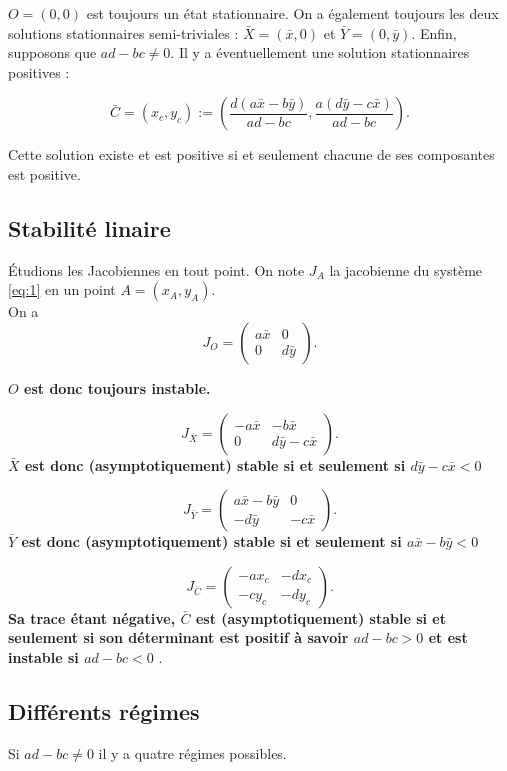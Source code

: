 \documentclass[a4paper,11pt,draft]{article}
\begin{document}
$O=(0,0)$ est toujours un état stationnaire. On a également toujours les deux solutions stationnaires semi-triviales :
$\bar{X}=(\bar{x},0)$ et $\bar{Y}=(0,\bar{y})$.
Enfin, supposons que $ad-bc\neq 0$. Il y a éventuellement une solution stationnaires positives :

$$\bar{C}=(x_c,y_c):=\left(\frac{d(a\bar{x}-b\bar{y})}{ad-bc},\frac{a(d\bar{y}-c\bar{x})}{ad-bc}\right).$$

Cette solution existe et est positive si et seulement chacune de ses composantes est positive.  
\subsection{Stabilité linaire}
\'Etudions les Jacobiennes en tout point. On note $J_A$ la jacobienne du système \eqref{eq:1} en un point $A=(x_A,y_A)$.\\
On a 
\begin{equation*}
J_O=
\begin{pmatrix}
    a\bar{x}&0\\
    0&d\bar{y}
\end{pmatrix}.
\end{equation*}

{\bf $O$ est donc toujours instable.}

\begin{equation*}
J_{\bar{X}}=
\begin{pmatrix}
    -a\bar{x}&-b\bar{x}\\
    0&d\bar{y}-c\bar{x}
\end{pmatrix}.
\end{equation*}
{\bf $\bar{X}$ est donc (asymptotiquement) stable si et seulement si $d\bar{y}-c\bar{x} <0$ }

$$J_{\bar{Y}}=
\begin{pmatrix}
    a\bar{x}-b\bar{y}&0\\
    -d\bar{y}&-c\bar{x}
\end{pmatrix}.
$$
{\bf $\bar{Y}$ est donc (asymptotiquement) stable si et seulement si $a\bar{x}-b\bar{y} <0$ }


$$J_{\bar{C}}=
\begin{pmatrix}
    -ax_c&-dx_c\\
    -c y_c&-dy_c
\end{pmatrix}.
$$
{\bf Sa trace étant négative, $\bar{C}$ est  (asymptotiquement) stable si et seulement si son déterminant est positif à savoir $ad-bc >0$ et est instable si $ad-bc<0$ }.


\subsection{Différents régimes}
Si $ad-bc\neq 0$ il y a quatre régimes possibles.
\end{document}
